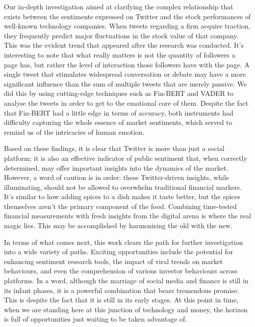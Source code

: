 \documentclass[12pt, a4paper,twoside]{report}
\theoremstyle{plain} %
\theoremstyle{definition} %
\theoremstyle{remark} %
\numberwithin{equation}{chapter}
\begin{document}
Our in-depth investigation aimed at clarifying the complex relationship that exists between the sentiments expressed on Twitter and the stock performances of well-known technology companies. When tweets regarding a firm acquire traction, they frequently predict major fluctuations in the stock value of that company. This was the evident trend that appeared after the research was conducted. It's interesting to note that what really matters is not the quantity of followers a page has, but rather the level of interaction those followers have with the page. A single tweet that stimulates widespread conversation or debate may have a more significant influence than the sum of multiple tweets that are merely passive. We did this by using cutting-edge techniques such as Fin-BERT and VADER to analyse the tweets in order to get to the emotional core of them. Despite the fact that Fin-BERT had a little edge in terms of accuracy, both instruments had difficulty capturing the whole essence of market sentiments, which served to remind us of the intricacies of human emotion.

Based on these findings, it is clear that Twitter is more than just a social platform; it is also an effective indicator of public sentiment that, when correctly determined, may offer important insights into the dynamics of the market. However, a word of caution is in order: these Twitter-driven insights, while illuminating, should not be allowed to overwhelm traditional financial markers. It's similar to how adding spices to a dish makes it taste better, but the spices themselves aren't the primary component of the food. Combining time-tested financial measurements with fresh insights from the digital arena is where the real magic lies. This may be accomplished by harmonising the old with the new.

In terms of what comes next, this work clears the path for further investigation into a wide variety of paths. Exciting opportunities include the potential for enhancing sentiment research tools, the impact of viral trends on market behaviours, and even the comprehension of various investor behaviours across platforms. In a word, although the marriage of social media and finance is still in its infant phases, it is a powerful combination that bears tremendous promise. This is despite the fact that it is still in its early stages. At this point in time, when we are standing here at this junction of technology and money, the horizon is full of opportunities just waiting to be taken advantage of.
\end{document}
